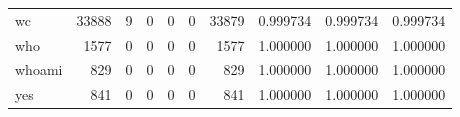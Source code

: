 \begin{tabular}{lrrrrrrrrr}
wc        &                               33888 &                                               9 &                                              0 &                                             0 &                                              0 &                                        33879 &                                           0.999734 &                               0.999734 &                             0.999734 \\
who       &                                1577 &                                               0 &                                              0 &                                             0 &                                              0 &                                         1577 &                                           1.000000 &                               1.000000 &                             1.000000 \\
whoami    &                                 829 &                                               0 &                                              0 &                                             0 &                                              0 &                                          829 &                                           1.000000 &                               1.000000 &                             1.000000 \\
yes       &                                 841 &                                               0 &                                              0 &                                             0 &                                              0 &                                          841 &                                           1.000000 &                               1.000000 &                             1.000000 \\
\bottomrule
\end{tabular}
